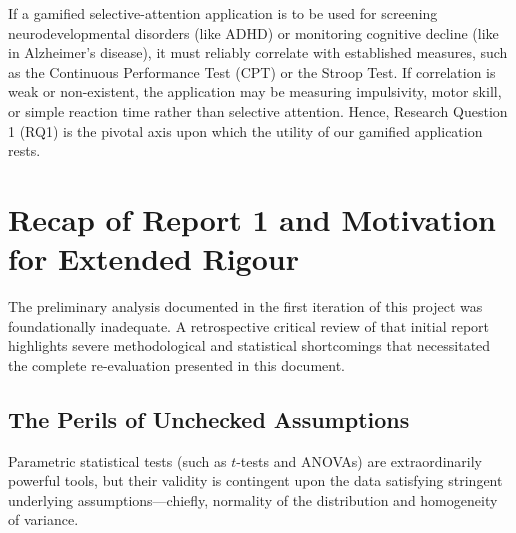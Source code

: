 \documentclass[11pt,a4paper]{article}
\begin{document}
If a gamified selective-attention application is to be used for screening neurodevelopmental disorders (like ADHD) or monitoring cognitive decline (like in Alzheimer's disease), it must reliably correlate with established measures, such as the Continuous Performance Test (CPT) or the Stroop Test. If correlation is weak or non-existent, the application may be measuring impulsivity, motor skill, or simple reaction time rather than selective attention. Hence, Research Question 1 (RQ1) is the pivotal axis upon which the utility of our gamified application rests.

\section{Recap of Report 1 and Motivation for Extended Rigour}
\label{sec:recap}

The preliminary analysis documented in the first iteration of this project was foundationally inadequate. A retrospective critical review of that initial report highlights severe methodological and statistical shortcomings that necessitated the complete re-evaluation presented in this document.

\subsection{The Perils of Unchecked Assumptions}
Parametric statistical tests (such as $t$-tests and ANOVAs) are extraordinarily powerful tools, but their validity is contingent upon the data satisfying stringent underlying assumptions—chiefly, normality of the distribution and homogeneity of variance. 
\end{document}
